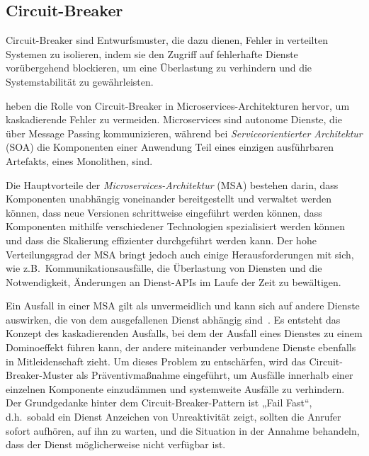 \subsection{Circuit-Breaker}


Circuit-Breaker sind Entwurfsmuster, die dazu dienen, Fehler in verteilten Systemen zu isolieren,
indem sie den Zugriff auf fehlerhafte Dienste vorübergehend blockieren,
um eine Überlastung zu verhindern und die Systemstabilität zu gewährleisten.

\citet{Montesi.19.09.2016} heben die Rolle von Circuit-Breaker in Microservices-Architekturen hervor,
um kaskadierende Fehler zu vermeiden. %
Microservices sind autonome Dienste, die über Message Passing kommunizieren, %
während bei \textit{Serviceorientierter Architektur} (SOA) die Komponenten einer Anwendung Teil eines
einzigen ausführbaren Artefakts, eines Monolithen, sind.

Die Hauptvorteile der \textit{Microservices-Architektur} (MSA) bestehen darin,
dass Komponenten unabhängig voneinander bereitgestellt und verwaltet werden können,
dass neue Versionen schrittweise eingeführt werden können, dass Komponenten
mithilfe verschiedener Technologien spezialisiert werden können und dass die Skalierung
effizienter durchgeführt werden kann.
Der hohe Verteilungsgrad der MSA bringt jedoch auch einige Herausforderungen mit sich,
wie z.B.\ Kommunikationsausfälle, die Überlastung von Diensten und die Notwendigkeit,
Änderungen an Dienst-APIs im Laufe der Zeit zu bewältigen.

Ein Ausfall in einer MSA gilt als unvermeidlich und kann
sich auf andere Dienste auswirken, die von dem ausgefallenen Dienst abhängig sind~\cite{Haley.28.06.2018,Montesi.19.09.2016}.
Es entsteht das Konzept des kaskadierenden Ausfalls, bei dem der Ausfall eines Dienstes
zu einem Dominoeffekt führen kann, der andere miteinander verbundene Dienste ebenfalls in
Mitleidenschaft zieht.
Um dieses Problem zu entschärfen, wird das Circuit-Breaker-Muster als Präventivmaßnahme eingeführt,
um Ausfälle innerhalb einer einzelnen Komponente einzudämmen und systemweite Ausfälle zu verhindern.
Der Grundgedanke hinter dem Circuit-Breaker-Pattern ist „Fail Fast“, d.h.\ sobald ein Dienst Anzeichen %
von Unreaktivität zeigt, sollten die Anrufer sofort aufhören, auf ihn zu warten,
und die Situation in der Annahme behandeln, dass der Dienst möglicherweise nicht verfügbar ist.

